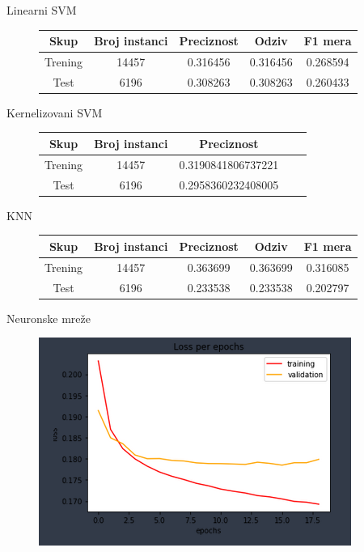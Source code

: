 \documentclass{beamer}
\begin{document}
\begin{frame}[fragile]{Linearni SVM}
    \begin{figure}[!h]
    \centering
    \begin{tabular}{ | c | c | c | c | c |}
        \hline
        Skup & Broj instanci & Preciznost & Odziv & F1 mera \\
        \hline
        Trening & 14457 & 0.316456 & 0.316456 & 0.268594 \\
        Test & 6196 & 0.308263 & 0.308263 & 0.260433 \\
        \hline
    \end{tabular}
    \end{figure}
\end{frame}

\begin{frame}[fragile]{Kernelizovani SVM}
    \begin{figure}[!h]
    \centering
    \begin{tabular}{ | c | c | c | c | c |}
        \hline
        Skup & Broj instanci & Preciznost \\
        \hline
        Trening & 14457 & 0.3190841806737221 \\
        Test & 6196 & 0.2958360232408005 \\
        \hline
    \end{tabular}
    \end{figure}
\end{frame}

\begin{frame}[fragile]{KNN}
    \begin{figure}[!h]
    \centering
    \begin{tabular}{ | c | c | c | c | c |}
        \hline
        Skup & Broj instanci & Preciznost & Odziv & F1 mera \\
        \hline
        Trening & 14457 & 0.363699 & 0.363699 & 0.316085 \\
        Test & 6196 & 0.233538 & 0.233538 & 0.202797 \\
        \hline
    \end{tabular}
    \end{figure}
\end{frame}

\begin{frame}[fragile]{Neuronske mre\v{z}e}
    \begin{figure}[!h]
    \centering
    \includegraphics[scale=0.9]{loss.PNG}
    \end{figure}
\end{frame}
\end{document}
